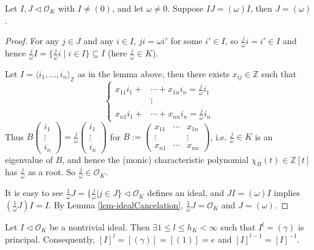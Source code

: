 \begin{lemma}\label{lem-idealCancelationPrincipal}
    Let $I,J\lhd \mathcal{O}_{K}$ with $I\neq(0)$, and let $\omega\neq0$. Suppose $IJ=(\omega)I$, then $J=(\omega)$. 
\end{lemma}

\begin{proof}
    For any $j\in J$ and any $i\in I$, $ji=\omega i'$ for some $i'\in I$, so $\frac{j}{\omega}i=i'\in I$ and hence $\frac{j}{\omega}I = \{\frac{j}{\omega} i \mid i \in I\} \subseteq I$ (here $\frac{j}{\omega}\in K$). 
    
    Let $I=\langle i_{1},\dots, i_{n}\rangle_{\mathbb{Z}}$ as in the lemma above, then there exists $x_{ij} \in \mathbb{Z}$ such that
    \[
    \left\{
        \begin{aligned}
            x_{11}i_{1}+&\cdots+x_{1n}i_{n}=\frac{j}{\omega}i_{1}\\
            &\vdots\\
            x_{n1}i_{1}+&\cdots+x_{nn}i_{n}=\frac{j}{\omega}i_{n}
        \end{aligned}
    \right.
    \]
    Thus $B\begin{pmatrix}
        i_{1}\\\vdots\\i_{n}
    \end{pmatrix}=\frac{j}{\omega}\begin{pmatrix}
        i_{1}\\\vdots\\i_{n}
    \end{pmatrix}$ for $B:=\begin{pmatrix}
        x_{11}&\cdots &x_{1n}\\
        \vdots&&\vdots\\
        x_{n1}&\cdots &x_{nn}
    \end{pmatrix}
    $, i.e. $\frac{j}{\omega} \in K$ is an eigenvalue of $B$, and hence the (monic) characteristic polynomial $\chi_{B}(t)\in \mathbb{Z}[t]$ has $\frac{j}{\omega}$ as a root. So $\frac{j}{\omega}\in \mathcal{O}_{K}$. 

    \medskip
    It is easy to see $\frac{1}{\omega}J=\{\frac{j}{\omega}|j\in J\}\lhd \mathcal{O}_{K}$ defines an ideal, and 
    $JI=(\omega)I$ implies $(\frac{1}{\omega}J)I=I$. By Lemma \ref{lem-idealCancelation}, $\frac{1}{\omega}J=\mathcal{O}_{K}$ and $J=(\omega)$. 
\end{proof}

\begin{theorem}\label{thm-idealClassFiniteOrder}
    Let $I\lhd \mathcal{O}_{K}$ be a nontrivial ideal. Then $\exists 1\leq l\leq h_{K}<\infty$ such that $I^{l}=(\gamma)$ is principal. Consequently, $[I]^{l}=[(\gamma)]=[(1)]=e$ and $[I]^{l-1}=[I]^{-1}$. 
\end{theorem}

